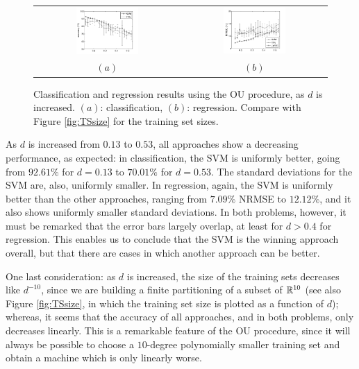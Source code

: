 \begin{figure}[!ht] \centering
  \begin{tabular}{cc}
    \includegraphics[width=0.45\textwidth]{figs/fig_all1.png} &
    \includegraphics[width=0.45\textwidth]{figs/fig_all2.png} \\
    $(a)$ & $(b)$ \\
  \end{tabular}
  \caption{Classification and regression results using the OU
  procedure, as $d$ is increased. $(a)$: classification, $(b)$:
    regression. Compare with Figure \ref{fig:TSsize} for the training
    set sizes.}
  \label{fig:allres}
\end{figure}

As $d$ is increased from $0.13$ to $0.53$, all approaches show a
decreasing performance, as expected: in classification, the SVM is
uniformly better, going from $92.61\%$ for $d=0.13$ to $70.01\%$ for
$d=0.53$. The standard deviations for the SVM are, also, uniformly
smaller. In regression, again, the SVM is uniformly better than the
other approaches, ranging from $7.09\%$ NRMSE to $12.12\%$, and it
also shows uniformly smaller standard deviations. In both problems,
however, it must be remarked that the error bars largely overlap, at
least for $d>0.4$ for regression. This enables us to conclude that the
SVM is the winning approach overall, but that there are cases in which
another approach can be better.

One last consideration: as $d$ is increased, the size of the training
sets decreases like $d^{-10}$, since we are building a finite
partitioning of a subset of $\mathbb{R}^{10}$ (see also Figure
\ref{fig:TSsize}, in which the training set size is plotted as a
function of $d$); whereas, it seems that the accuracy of all
approaches, and in both problems, only decreases linearly. This is a
remarkable feature of the OU procedure, since it will always be
possible to choose a $10$-degree polynomially smaller training set and
obtain a machine which is only linearly worse.

